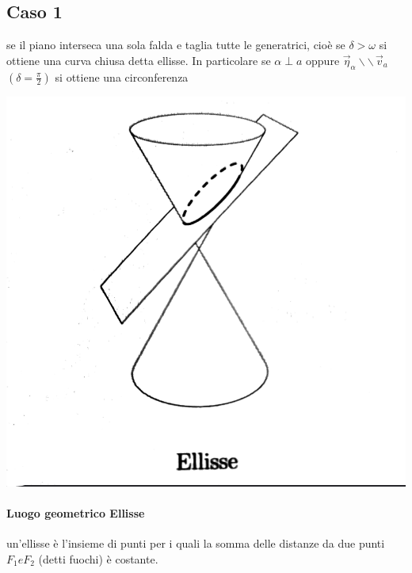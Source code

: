 \documentclass[a4paper,11pt]{article}
\begin{document}
\subsection{Caso 1}
se il piano interseca una sola falda e taglia tutte le generatrici, cioè se \( \delta > \omega \) si ottiene una curva chiusa detta ellisse. 
In particolare se \( \alpha \perp a \) oppure \( \vec{\eta}_\alpha \backslash \backslash \, \vec{v}_a \)   \( (\delta = \frac{\pi}{2}) \) si ottiene una circonferenza
\begin{center}
\begin{minipage}{8cm}
    \includegraphics[scale=0.3]{ellisse.png}
\end{minipage}
\end{center}
\paragraph{Luogo geometrico Ellisse}
un'ellisse è l'insieme di punti per i quali la somma delle distanze da due punti \(F_1 e F_2\) (detti fuochi) è costante.
\end{document}

